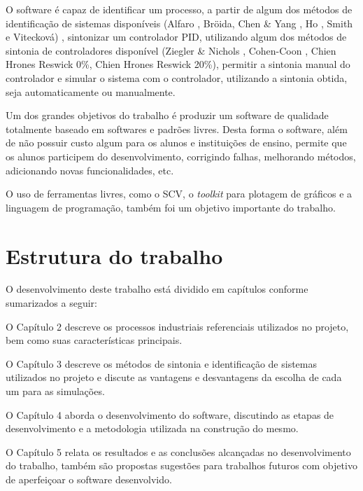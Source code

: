     O software é capaz de identificar um processo, a partir de algum dos
    métodos de identificação de sistemas disponíveis (Alfaro \cite{Alfaro2}, Bröida,
    Chen \& Yang \cite{ChenYang}, Ho \cite{Ho}, Smith \cite{Smith} e Vitecková)
    \cite{Viteckova}, sintonizar um controlador \acs{PID},
    utilizando algum dos métodos de sintonia de controladores disponível (Ziegler
    \& Nichols \cite{ZieglerNicholsAsme}, Cohen-Coon \cite{CohenCoon},
    Chien Hrones Reswick 0\%, Chien Hrones Reswick 20\%),
    permitir a sintonia manual do controlador e simular o sistema com o controlador,
    utilizando a sintonia obtida, seja automaticamente ou manualmente.
    
    Um dos grandes objetivos do trabalho é produzir um software de qualidade 
    totalmente baseado em softwares e padrões livres. Desta forma o software,
    além de não possuir custo algum para os alunos e instituições de ensino, permite
    que os alunos participem do desenvolvimento, corrigindo falhas, melhorando
    métodos, adicionando novas funcionalidades, etc.
    
    O uso de ferramentas livres, como o \ac{SCV}, o \textit{toolkit} para plotagem
    de gráficos e a linguagem de programação, também foi um objetivo importante do trabalho.

\section{Estrutura do trabalho}

    O desenvolvimento deste trabalho está dividido em capítulos conforme sumarizados
    a seguir:

    O Capítulo 2 descreve os processos industriais referenciais utilizados no projeto,
    bem como suas características principais.
    
    O Capítulo 3 descreve os métodos de sintonia e identificação de sistemas utilizados
    no projeto e discute as vantagens e desvantagens da escolha de cada um para as
    simulações.
    
    O Capítulo 4 aborda o desenvolvimento do software, discutindo as etapas de
    desenvolvimento e a metodologia utilizada na construção do mesmo.
    
    O Capítulo 5 relata os resultados e as conclusões alcançadas no desenvolvimento do
    trabalho, também são propostas sugestões para trabalhos futuros com objetivo de
    aperfeiçoar o software desenvolvido.
